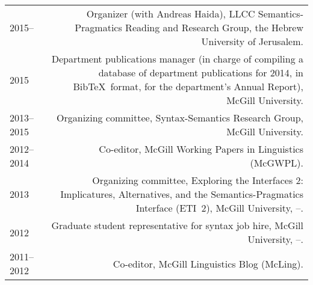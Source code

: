 \documentclass[11pt,letterpaper,twoside]{article}
\makeatletter
\newcommand{\formatdatenoday}[2]{\mydatenoday\formatdate{0}{#1}{#2}}
\newenvironment{cvsection}{%
  \renewcommand{\arraystretch}{1.75}
  \begin{longtable}[l]{@{} L R @{}}
}{%
  \end{longtable}
}
\makeatother
\begin{document}
\begin{cvsection}
  2015-- & Organizer (with Andreas Haida), LLCC Semantics-Pragmatics Reading
  and Research Group, the Hebrew University of Jerusalem.\\

  2015 & Department publications manager (in charge of compiling a database of
  department publications for 2014, in Bib\TeX\ format, for the department's
  Annual Report), McGill University.\\

  2013--2015 & Organizing committee, Syntax-Semantics Research Group, McGill
  University.\\

  2012--2014 & Co-editor, McGill Working Papers in Linguistics (McGWPL).\\

  2013 & Organizing committee, Exploring the Interfaces 2: Implicatures,
  Alternatives, and the Semantics-Pragmatics Interface (ETI~2), McGill
  University, \shortmonthname[4]--\formatdatenoday{6}{2013}.\\




  2012 & Graduate student representative for syntax job hire, McGill
  University, \shortmonthname[5]--\formatdatenoday{6}{2012}.\\




  2011--2012 & Co-editor, McGill Linguistics Blog (McLing).\\
\end{cvsection}
\end{document}
